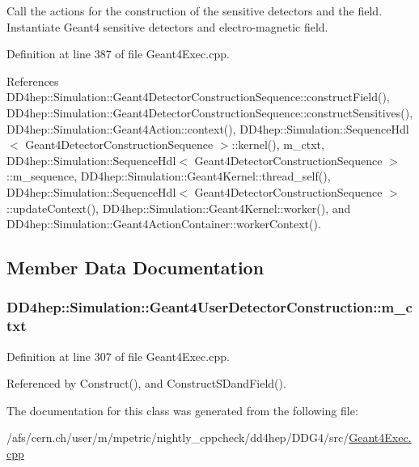 Call the actions for the construction of the sensitive detectors and the field. Instantiate Geant4 sensitive detectors and electro-\/magnetic field. 

Definition at line 387 of file Geant4Exec.cpp.

References DD4hep::Simulation::Geant4DetectorConstructionSequence::constructField(), DD4hep::Simulation::Geant4DetectorConstructionSequence::constructSensitives(), DD4hep::Simulation::Geant4Action::context(), DD4hep::Simulation::SequenceHdl$<$ Geant4DetectorConstructionSequence $>$::kernel(), m\_\-ctxt, DD4hep::Simulation::SequenceHdl$<$ Geant4DetectorConstructionSequence $>$::m\_\-sequence, DD4hep::Simulation::Geant4Kernel::thread\_\-self(), DD4hep::Simulation::SequenceHdl$<$ Geant4DetectorConstructionSequence $>$::updateContext(), DD4hep::Simulation::Geant4Kernel::worker(), and DD4hep::Simulation::Geant4ActionContainer::workerContext().

\subsection{Member Data Documentation}
\hypertarget{class_d_d4hep_1_1_simulation_1_1_geant4_user_detector_construction_ab099fe83f02b9f8ffdda9f0f21a01202}{
\subsubsection[{m\_\-ctxt}]{ {\bf DD4hep::Simulation::Geant4UserDetectorConstruction::m\_\-ctxt}}}
\label{class_d_d4hep_1_1_simulation_1_1_geant4_user_detector_construction_ab099fe83f02b9f8ffdda9f0f21a01202}


Definition at line 307 of file Geant4Exec.cpp.

Referenced by Construct(), and ConstructSDandField().

The documentation for this class was generated from the following file:\begin{DoxyCompactItemize}
\item 
/afs/cern.ch/user/m/mpetric/nightly\_\-cppcheck/dd4hep/DDG4/src/\hyperlink{_geant4_exec_8cpp}{Geant4Exec.cpp}\end{DoxyCompactItemize}
